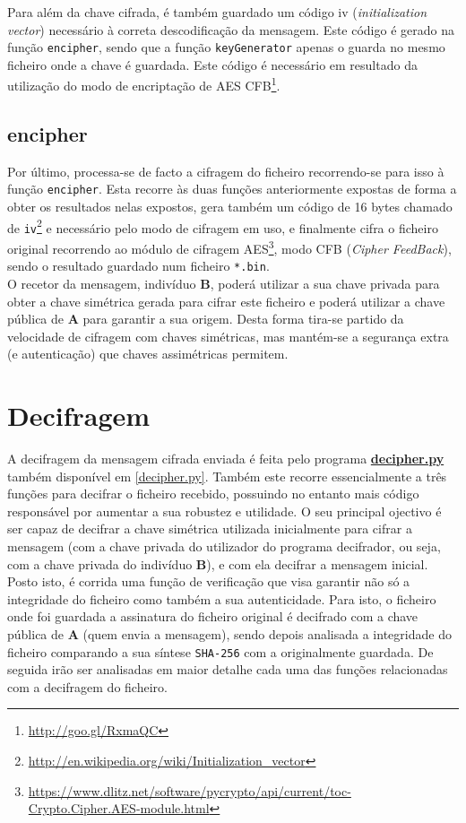 \documentclass[a4paper,11pt,openright,oneside]{report}
\begin{document}
Para além da chave cifrada, é também guardado um código iv (\textit{initialization vector}) necessário à correta descodificação da mensagem. Este código é gerado na função \verb|encipher|, sendo que a função \verb|keyGenerator| apenas o guarda no mesmo ficheiro onde a chave é guardada. Este código é necessário em resultado da utilização do modo de encriptação de AES CFB\footnote{\url{http://goo.gl/RxmaQC}}.

\subsection{encipher}

Por último, processa-se de facto a cifragem do ficheiro recorrendo-se para isso à função \verb|encipher|. Esta recorre às duas funções anteriormente expostas de forma a obter os resultados nelas expostos, gera também um código de 16 bytes chamado de \verb|iv|\footnote{\url{http://en.wikipedia.org/wiki/Initialization_vector}} e necessário pelo modo de cifragem em uso, e finalmente cifra o ficheiro original recorrendo ao módulo de cifragem AES\footnote{\url{https://www.dlitz.net/software/pycrypto/api/current/toc-Crypto.Cipher.AES-module.html}}, modo CFB (\textit{Cipher FeedBack}), sendo o resultado guardado num ficheiro \verb|*.bin|.\\

O recetor da mensagem, indivíduo \textbf{B}, poderá utilizar a sua chave privada para obter a chave simétrica gerada para cifrar este ficheiro e poderá utilizar a chave pública de \textbf{A} para garantir a sua origem. Desta forma tira-se partido da velocidade de cifragem com chaves simétricas, mas mantém-se a segurança extra (e autenticação) que chaves assimétricas permitem.

\section{Decifragem}

A decifragem da mensagem cifrada enviada é feita pelo programa \href{../Python/Receiver/decipher.py}{\textbf{de\-ci\-pher.py}} também disponível em \ref{decipher.py}. Também este recorre essencialmente a três funções para decifrar o ficheiro recebido, possuindo no entanto mais código responsável por aumentar a sua robustez e utilidade. O seu principal ojectivo é ser capaz de decifrar a chave simétrica utilizada inicialmente para cifrar a mensagem (com a chave privada do utilizador do programa decifrador, ou seja, com a chave privada do indivíduo \textbf{B}), e com ela decifrar a mensagem inicial. Posto isto, é corrida uma função de verificação que visa garantir não só a integridade do ficheiro como também a sua autenticidade. Para isto, o ficheiro onde foi guardada a assinatura do ficheiro original é decifrado com a chave pública de \textbf{A} (quem envia a mensagem), sendo depois analisada a integridade do ficheiro comparando a sua síntese \verb|SHA-256| com a originalmente guardada. De seguida irão ser analisadas em maior detalhe cada uma das funções relacionadas com a decifragem do ficheiro.
\end{document}
